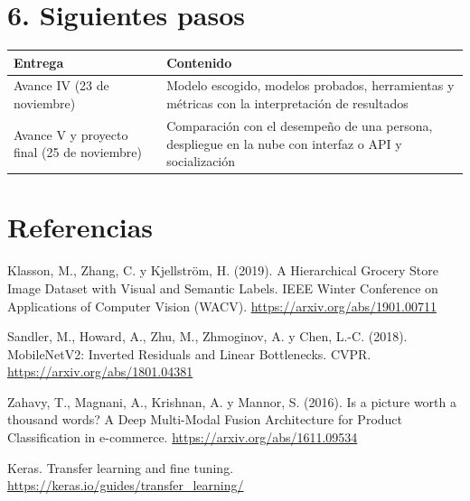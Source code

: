 \documentclass[11pt,a4paper]{article}
\begin{document}
\section*{6. Siguientes pasos}
\begin{center}\small
\begin{tabularx}{\textwidth}{XX}
\toprule
\textbf{Entrega} & \textbf{Contenido} \\
\midrule
Avance IV (23 de noviembre) & Modelo escogido, modelos probados, herramientas y métricas con la interpretación de resultados \\
Avance V y proyecto final (25 de noviembre) & Comparación con el desempeño de una persona, despliegue en la nube con interfaz o API y socialización \\
\bottomrule
\end{tabularx}
\end{center}
\section*{Referencias}
\noindent [1] Klasson, M., Zhang, C. y Kjellström, H. (2019). A Hierarchical Grocery Store Image Dataset with Visual and Semantic Labels. IEEE Winter Conference on Applications of Computer Vision (WACV). \url{https://arxiv.org/abs/1901.00711}\par
\noindent [2] Sandler, M., Howard, A., Zhu, M., Zhmoginov, A. y Chen, L.-C. (2018). MobileNetV2: Inverted Residuals and Linear Bottlenecks. CVPR. \url{https://arxiv.org/abs/1801.04381}\par
\noindent [3] Zahavy, T., Magnani, A., Krishnan, A. y Mannor, S. (2016). Is a picture worth a thousand words? A Deep Multi-Modal Fusion Architecture for Product Classification in e-commerce. \url{https://arxiv.org/abs/1611.09534}\par
\noindent [4] Keras. Transfer learning and fine tuning. \url{https://keras.io/guides/transfer_learning/}\par
\end{document}
